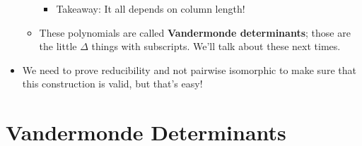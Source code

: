 \documentclass[../notes.tex]{subfiles}
\begin{document}
\begin{itemize}
\begin{itemize}
\begin{itemize}
            \item Takeaway: It all depends on column length!
        \end{itemize}
        \item These polynomials are called \textbf{Vandermonde determinants}; those are the little $\Delta$ things with subscripts. We'll talk about these next times.
    \end{itemize}
    \item We need to prove reducibility and not pairwise isomorphic to make sure that this construction is valid, but that's easy!
\end{itemize}



\section{Vandermonde Determinants}
\end{document}
